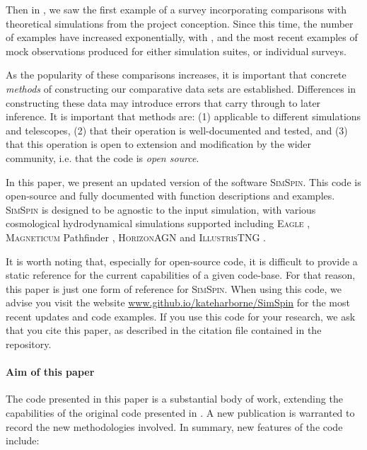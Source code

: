 \documentclass[
  journal=pasa,
  manuscript=research-paper, %
  year=2020,
  volume=37,
]{cup-journal}
\newcommand{\simspin}[1]{\textsc{SimSpin}#1} %
\newcommand{\eagle}[1]{\textsc{Eagle}#1} %
\newcommand{\magneticum}[1]{\textsc{Magneticum}#1} %
\newcommand{\illustristng}[1]{\textsc{IllustrisTNG}#1} %
\newcommand{\horizon}[1]{\textsc{HorizonAGN}#1} %
\begin{document}
Then in \citealt{Foster2021MAGPIOverview}, we saw the first example of a survey incorporating comparisons with theoretical simulations from the project conception. 
Since this time, the number of examples have increased exponentially, with \citealt{Bottrell2022RealisticIFS}, \citealt{Nanni2022iMaNGAcubes} and \citealt{Sarmiento2023MaNGIAanalysis} the most recent examples of mock observations produced for either simulation suites, or individual surveys.

As the popularity of these comparisons increases, it is important that concrete \textit{methods} of constructing our comparative data sets are established. 
Differences in constructing these data may introduce errors that carry through to later inference. 
It is important that methods are: (1) applicable to different simulations and telescopes, (2) that their operation is well-documented and tested, and (3) that this operation is open to extension and modification by the wider community, i.e. that the code is \textit{open source}. 

In this paper, we present an updated version of the software \simspin. 
This code is open-source and fully documented with function descriptions and examples.
\simspin{} is designed to be agnostic to the input simulation, with various cosmological hydrodynamical simulations supported including \eagle{} \citep{Schaye2015TheEnvironments}, \magneticum{} Pathfinder \citep{Dolag2005ThePlanck}, \horizon{} \citep{Dubois2014DancingWeb} and \illustristng{} \citep{Vogelsberger2020CosmologicalFormation}. 

It is worth noting that, especially for open-source code, it is difficult to provide a static reference for the current capabilities of a given code-base. 
For that reason, this paper is just one form of reference for \simspin.
When using this code, we advise you visit the website \url{www.github.io/kateharborne/SimSpin} for the most recent updates and code examples.
If you use this code for your research, we ask that you cite this paper, as described in the citation file contained in the repository. 

\paragraph{Aim of this paper \\}

The code presented in this paper is a substantial body of work, extending the capabilities of the original code presented in \citealt{Harborne2020SimSpinCubes}. 
A new publication is warranted to record the new methodologies involved. 
In summary, new features of the code include:
\end{document}
